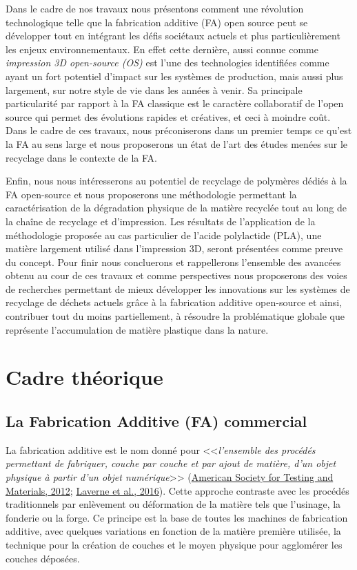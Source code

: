 \documentclass[
]{article}
\begin{document}
Dans le cadre de nos travaux nous présentons comment une révolution
technologique telle que la fabrication additive (FA) open source peut se
développer tout en intégrant les défis sociétaux actuels et plus
particulièrement les enjeux environnementaux. En effet cette dernière,
aussi connue comme \emph{impression 3D open-source (OS)} est l'une des
technologies identifiées comme ayant un fort potentiel d'impact sur les
systèmes de production, mais aussi plus largement, sur notre style de
vie dans les années à venir. Sa principale particularité par rapport à
la FA classique est le caractère collaboratif de l'open source qui
permet des évolutions rapides et créatives, et ceci à moindre coût. Dans
le cadre de ces travaux, nous préconiserons dans un premier temps ce
qu'est la FA au sens large et nous proposerons un état de l'art des
études menées sur le recyclage dans le contexte de la FA.

Enfin, nous nous intéresserons au potentiel de recyclage de polymères
dédiés à la FA open-source et nous proposerons une méthodologie
permettant la caractérisation de la dégradation physique de la matière
recyclée tout au long de la chaîne de recyclage et d'impression. Les
résultats de l'application de la méthodologie proposée au cas
particulier de l'acide polylactide (PLA), une matière largement utilisé
dans l'impression 3D, seront présentées comme preuve du concept. Pour
finir nous concluerons et rappellerons l'ensemble des avancées obtenu au
cour de ces travaux et comme perspectives nous proposerons des voies de
recherches permettant de mieux développer les innovations sur les
systèmes de recyclage de déchets actuels grâce à la fabrication additive
open-source et ainsi, contribuer tout du moins partiellement, à résoudre
la problématique globale que représente l'accumulation de matière
plastique dans la nature.

\hypertarget{cadre-thuxe9orique}{%
\section{Cadre théorique}\label{cadre-thuxe9orique}}

\hypertarget{la-fabrication-additive-fa-commercial}{%
\subsection{La Fabrication Additive (FA)
commercial}\label{la-fabrication-additive-fa-commercial}}

La fabrication additive est le nom donné pour
\textless\textless{}\emph{l'ensemble des procédés permettant de
fabriquer, couche par couche et par ajout de matière, d'un objet
physique à partir d'un objet numérique}\textgreater\textgreater{}
(\protect\hyperlink{ref-ASTM2012}{American Society for Testing and
Materials, 2012}; \protect\hyperlink{ref-Laverne2016}{Laverne et al.,
2016}). Cette approche contraste avec les procédés traditionnels par
enlèvement ou déformation de la matière tels que l'usinage, la fonderie
ou la forge. Ce principe est la base de toutes les machines de
fabrication additive, avec quelques variations en fonction de la matière
première utilisée, la technique pour la création de couches et le moyen
physique pour agglomérer les couches déposées.
\end{document}

